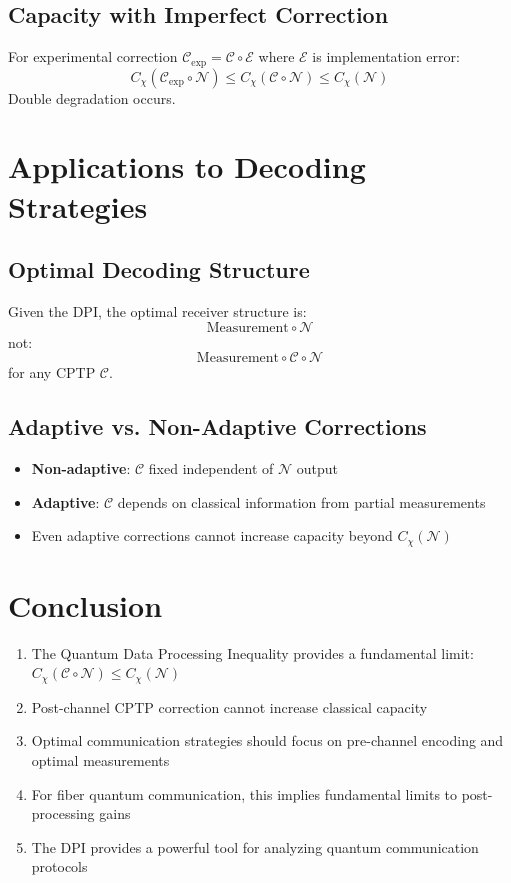 \documentclass[12pt]{article}
\begin{document}
\subsection{Capacity with Imperfect Correction}
For experimental correction $\mathcal{C}_{\text{exp}} = \mathcal{C} \circ \mathcal{E}$ where $\mathcal{E}$ is implementation error:
\[
C_{\chi}(\mathcal{C}_{\text{exp}} \circ \mathcal{N}) \leq C_{\chi}(\mathcal{C} \circ \mathcal{N}) \leq C_{\chi}(\mathcal{N})
\]
Double degradation occurs.

\section{Applications to Decoding Strategies}

\subsection{Optimal Decoding Structure}
Given the DPI, the optimal receiver structure is:
\[
\text{Measurement} \circ \mathcal{N}
\]
not:
\[
\text{Measurement} \circ \mathcal{C} \circ \mathcal{N}
\]
for any CPTP $\mathcal{C}$.

\subsection{Adaptive vs. Non-Adaptive Corrections}
\begin{itemize}
    \item \textbf{Non-adaptive}: $\mathcal{C}$ fixed independent of $\mathcal{N}$ output
    \item \textbf{Adaptive}: $\mathcal{C}$ depends on classical information from partial measurements
    \item Even adaptive corrections cannot increase capacity beyond $C_{\chi}(\mathcal{N})$
\end{itemize}

\section{Conclusion}

\begin{enumerate}
    \item The Quantum Data Processing Inequality provides a fundamental limit: $C_{\chi}(\mathcal{C} \circ \mathcal{N}) \leq C_{\chi}(\mathcal{N})$
    \item Post-channel CPTP correction cannot increase classical capacity
    \item Optimal communication strategies should focus on pre-channel encoding and optimal measurements
    \item For fiber quantum communication, this implies fundamental limits to post-processing gains
    \item The DPI provides a powerful tool for analyzing quantum communication protocols
\end{enumerate}
\end{document}
